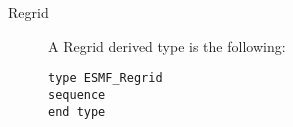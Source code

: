 

\begin{description}

\item [Regrid] A Regrid derived type is the following:
\begin{verbatim}
type ESMF_Regrid
sequence
end type
\end{verbatim}


\end{description}



